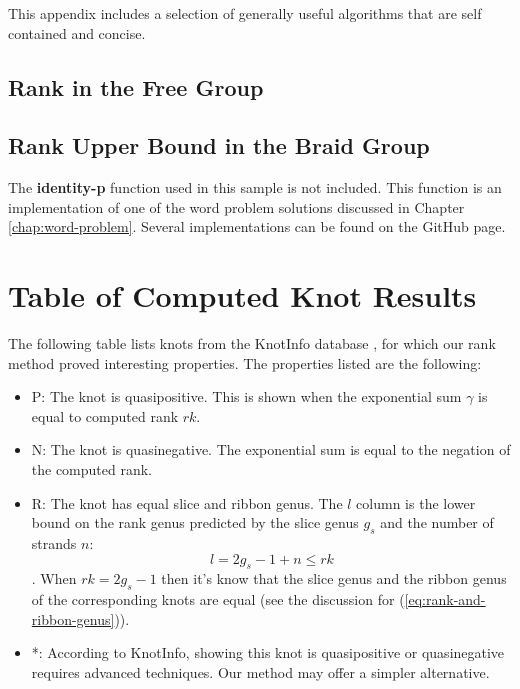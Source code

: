 \documentclass[12pt]{thesis}
\begin{document}
This appendix includes a selection of generally useful algorithms
that are self contained and concise.

\section{Rank in the Free Group}

\label{free-rank-code}

\begin{singlespace}
    
\end{singlespace}

\section{Rank Upper Bound in the Braid Group}

The \textbf{identity-p} function used in this sample
is not included.
This function is an implementation of one of the word problem solutions
discussed in Chapter \ref{chap:word-problem}.
Several implementations can be found on the GitHub page.

\label{braid-rank-code}

\begin{singlespace}
    
\end{singlespace}

\chapter{Table of Computed Knot Results}

\label{knotinfo-table} 

The following table lists knots from the KnotInfo 
database \cite{knotinfo},
for which our rank method proved interesting properties.
The properties listed are the following:
\begin{itemize}
    \item P: The knot is quasipositive. This is shown when the exponential sum $\gamma$ is equal to computed rank $rk$.
    \item N: The knot is quasinegative. The exponential sum is equal to the negation of the computed rank.
    \item R: The knot has equal slice and ribbon genus.
        The $l$ column is the lower bound on the rank
        genus predicted by the slice genus $g_{s}$ and the number of strands $n$:
        \[
            l = 2g_{s} - 1 + n \leq rk
        \].
        When $rk = 2g_{s} - 1$ then it's know that the slice genus
        and the ribbon genus of the corresponding knots are equal
        (see the discussion for (\ref{eq:rank-and-ribbon-genus})).

   \item *: According to KnotInfo, showing this knot is quasipositive or
            quasinegative requires
            advanced techniques.
            Our method may offer a simpler alternative.
\end{itemize}
\end{document}
